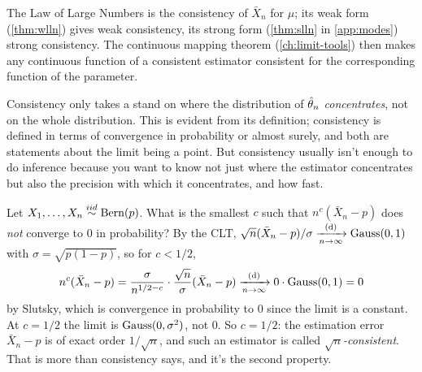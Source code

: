 The Law of Large Numbers is the consistency of $\bar{X}_n$ for $\mu$; its weak form (\cref{thm:wlln}) gives weak consistency, its strong form (\cref{thm:slln} in \cref{app:modes}) strong consistency.
The continuous mapping theorem (\cref{ch:limit-tools}) then makes any continuous function of a consistent estimator consistent for the corresponding function of the parameter.

Consistency only takes a stand on where the distribution of $\hat{\theta}_n$ \textit{concentrates}, not on the whole distribution.
This is evident from its definition; consistency is defined in terms of convergence in probability or almost surely, and both are statements about the limit being a point.
But consistency usually isn't enough to do inference because you want to know not just where the estimator concentrates but also the precision with which it concentrates, and how fast.

\begin{example}
\label{ex:rate}
Let $X_1, \ldots, X_n \stackrel{iid}{\sim} \text{Bern}(p)$.
What is the smallest $c$ such that $n^c(\bar{X}_n - p)$ does \textit{not} converge to $0$ in probability?
By the CLT, $\sqrt{n}(\bar{X}_n - p)/\sigma \xrightarrow [n \to \infty ]{\text{(d)}} \text{Gauss}(0,1)$ with $\sigma = \sqrt{p(1-p)}$, so for $c < 1/2$,
\[
n^c (\bar{X}_n - p) = \frac{\sigma}{n^{1/2 - c}} \cdot \frac{\sqrt{n}}{\sigma} (\bar{X}_n - p) \xrightarrow [n \to \infty ]{\text{(d)}} 0 \cdot \text{Gauss}(0,1) = 0
\]
by Slutsky, which is convergence in probability to $0$ since the limit is a constant.
At $c = 1/2$ the limit is $\text{Gauss}(0, \sigma^2)$, not $0$.
So $c = 1/2$: the estimation error $\bar{X}_n - p$ is of exact order $1/\sqrt{n}$, and such an estimator is called \textit{$\sqrt{n}$-consistent}.
That is more than consistency says, and it's the second property.
\end{example}

